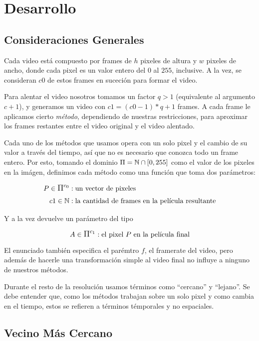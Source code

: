\section{Desarrollo}

\subsection{Consideraciones Generales}

Cada video est\'a compuesto por frames de $h$ pixeles de altura y $w$ pixeles de
ancho, donde cada pixel es un valor entero del $0$ al $255$, inclusive. A la
vez, se consideran $c0$ de estos frames en suceci\'on para formar el video.

Para alentar el video nosotros tomamos un factor $q > 1$ (equivalente al
argumento $c + 1$), y generamos un video con $c1 = (c0 - 1) * q + 1$ frames. A cada frame
le aplicamos cierto \textit{m\'etodo}, dependiendo de nuestras restricciones,
para aproximar los frames restantes entre el video original y el video alentado.

Cada uno de los m\'etodos que usamos opera con un solo pixel y el cambio de su
valor a trav\'es del tiempo, as\'i que no es necesario que conozca todo un frame
entero. Por esto, tomando el dominio $\mathlarger{\Pi} = \mathbb{N} \cap \left[ 0, 255
\right]$ como el valor de los pixeles en la im\'agen, definimos cada m\'etodo
como una funci\'on que toma dos par\'ametros:

\[
\begin{split}
P \in \mathlarger{\Pi^{c_0}} & : \text{un vector de pixeles} \\
c1 \in \mathbb{N} & : \text{la cantidad de frames en la pel\'icula resultante}
\end{split}
\]

Y a la vez devuelve un par\'ametro del tipo

\[
A \in \mathlarger{\Pi^{c_1}} : \text{el pixel $P$ en la pel\'icula final}
\]

El enunciado tambi\'en especifica el par\'emtro $f$, el framerate del video,
pero adem\'as de hacerle una transformaci\'on simple al video final no influye a
ninguno de nuestros m\'etodos.

Durante el resto de la resoluci\'on usamos t\'erminos como ``cercano'' y
``lejano''. Se debe entender que, como los m\'etodos trabajan sobre un solo
pixel y como cambia en el tiempo, estos se refieren a t\'erminos t\'emporales y
no espaciales.

\subsection{Vecino M\'as Cercano}


